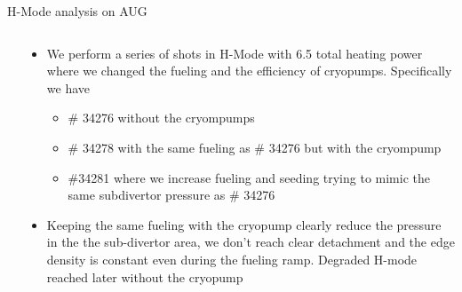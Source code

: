 \documentclass[10pt, compress]{beamer}
\newcommand\Fontvi{\fontsize{8}{7.2}\selectfont}
\begin{document}
\begin{frame}{H-Mode analysis on AUG}
    \Fontvi
  \vspace{-1cm}
  \begin{columns}
  \begin{column}{0.55\textwidth}
  \end{column}
  \begin{column}{0.45\textwidth}
    \begin{itemize}
    \item<1|only@1> We perform a series of shots in H-Mode with 6.5
      total heating power where we changed the fueling and the
      efficiency of cryopumps. Specifically we have
      \begin{itemize}
        \item<1|only@1>\textcolor{colorA}{\# 34276 without the
            cryompumps}
        \item<1|only@1> \textcolor{colorB}{\# 34278 with the same
            fueling as} \textcolor{colorA}{\# 34276} \textcolor{colorB}{but with the cryompump}
        \item<1|only@1> \textcolor{colorC}{\#34281 where we increase
            fueling and seeding trying to mimic the same subdivertor
            pressure as} \textcolor{colorA}{\# 34276}
      \end{itemize}
    \item<1|only@1> Keeping the same fueling with the cryopump clearly
      reduce the pressure in the the sub-divertor area, we don't reach
      clear detachment and the edge density is constant even during
      the fueling ramp. Degraded H-mode reached later without the cryopump
      

\end{itemize}
\end{column}
\end{columns}
\end{frame}
\end{document}
